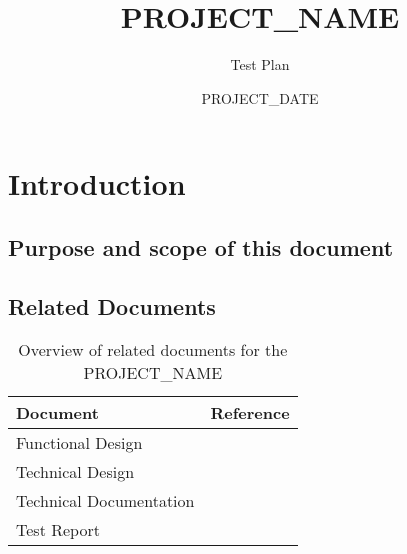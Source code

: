 \documentclass[signature]{deltares_report}
\begin{document}
\pagestyle{empty}
\cleardoublepage
%

\newcommand{\ProgramName}{PROJECT_NAME\xspace}

\title{\ProgramName}
\subtitle{Test Plan}
\classification{-}

\date{PROJECT_DATE}



\summary{}

\revieweri{}
\approvali{}

\disclaimer{}

\deltarestitle


\chapter{Introduction} 
\label{chapterIntroduction}

\section{Purpose and scope of this document} \label{sec:PurposeAndScope}

\section{Related Documents}
\label{sec:RelatedDocuments}
\bigskip
\begin{longtable}{|p{}|p{}|}
\caption{Overview of related documents for the \ProgramName \label{tab:RelatedDocuments}}\\	\hline
		\hline 
		\textbf{Document} & \textbf{Reference} \\
		\hline 
		\hline 
		Functional Design & \citep{PROJECT_NAME_FunctionalDesignPROJECT_YEAR} \\
		Technical Design & \citep{PROJECT_NAME_TechnicalDesignPROJECT_YEAR} \\
		Technical Documentation & \citep{PROJECT_NAME_TechnicalDocumentationPROJECT_YEAR} \\
		Test Report & \citep{PROJECT_NAME_TestReportPROJECT_YEAR}  \\
    \hline			
\end{longtable}
\end{document}
